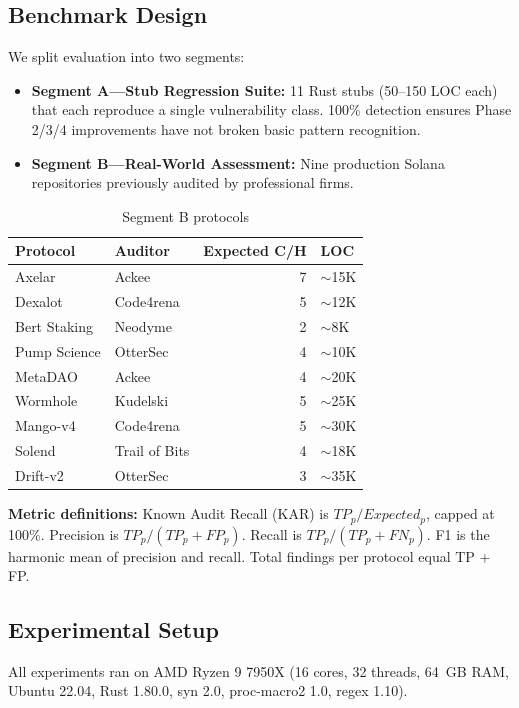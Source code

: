 \documentclass[conference]{IEEEtran}
\begin{document}
\subsection{Benchmark Design}

We split evaluation into two segments:
\begin{itemize}
  \item {\bf Segment A---Stub Regression Suite:} 11 Rust stubs (50--150 LOC each) that each reproduce a single vulnerability class. 100\% detection ensures Phase 2/3/4 improvements have not broken basic pattern recognition.
  \item {\bf Segment B---Real-World Assessment:} Nine production Solana repositories previously audited by professional firms.
\end{itemize}

\begin{table}[htbp]
  \caption{Segment B protocols}
  \label{tab:seg_b_protocols}
  \centering
  \begin{tabular}{llrl}
    \hline
    Protocol & Auditor & Expected C/H & LOC \\
    \hline
    Axelar & Ackee & 7 & $\sim$15K \\
    Dexalot & Code4rena & 5 & $\sim$12K \\
    Bert Staking & Neodyme & 2 & $\sim$8K \\
    Pump Science & OtterSec & 4 & $\sim$10K \\
    MetaDAO & Ackee & 4 & $\sim$20K \\
    Wormhole & Kudelski & 5 & $\sim$25K \\
    Mango-v4 & Code4rena & 5 & $\sim$30K \\
    Solend & Trail of Bits & 4 & $\sim$18K \\
    Drift-v2 & OtterSec & 3 & $\sim$35K \\
    \hline
  \end{tabular}
\end{table}

{\bf Metric definitions:} Known Audit Recall (KAR) is $TP_p / Expected_p$, capped at 100\%. Precision is $TP_p / (TP_p + FP_p)$. Recall is $TP_p / (TP_p + FN_p)$. F1 is the harmonic mean of precision and recall. Total findings per protocol equal TP + FP.

\subsection{Experimental Setup}

All experiments ran on AMD Ryzen 9 7950X (16 cores, 32 threads, 64~GB RAM, Ubuntu 22.04, Rust 1.80.0, syn 2.0, proc-macro2 1.0, regex 1.10).
\end{document}
